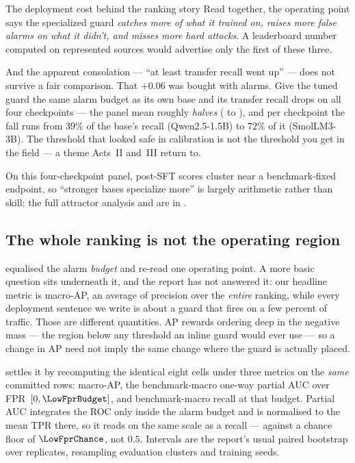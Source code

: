 \begin{takeaway}{The deployment cost behind the ranking story}
Read together, the operating point says the specialized guard \emph{catches more of what it trained on,
raises more false alarms on what it didn't, and misses more hard attacks}. A leaderboard number computed
on represented sources would advertise only the first of these three.

And the apparent consolation --- ``at least transfer recall went up'' --- does not survive a fair
comparison. That $+0.06$ was bought with alarms. Give the tuned guard the same alarm budget as its own
base and its transfer recall drops on all four checkpoints --- the panel mean roughly \emph{halves}
(\MatchedTransferBase{} to \MatchedTransferSft{}), and per checkpoint the fall runs from $39\%$ of the
base's recall (Qwen2.5-1.5B) to $72\%$ of it (SmolLM3-3B). The threshold that looked safe in calibration is not the threshold you get in the field ---
a theme Acts~II and~III return to.
\end{takeaway}

\noindent On this four-checkpoint panel, post-SFT scores cluster near a benchmark-fixed endpoint, so ``stronger bases specialize more'' is largely arithmetic rather than skill; the full attractor analysis and  are in .

\subsection{The whole ranking is not the operating region}
\label{sec:actI-lowfpr}

 equalised the alarm \emph{budget} and re-read one operating point. A more basic
question sits underneath it, and the report has not answered it: our headline metric is macro-AP,
an average of precision over the \emph{entire} ranking, while every deployment sentence we write is
about a guard that fires on a few percent of traffic. Those are different quantities. AP rewards
ordering deep in the negative mass --- the region below any threshold an inline guard would ever
use --- so a change in AP need not imply the same change where the guard is actually placed.

 settles it by recomputing the identical eight cells under three metrics on the
\emph{same} committed rows: macro-AP, the benchmark-macro one-way partial AUC over
FPR~$[0,\LowFprBudget]$, and benchmark-macro recall at that budget. Partial AUC integrates the ROC
only inside the alarm budget and is normalised to the mean TPR there, so it reads on the same scale
as a recall --- against a chance floor of $\LowFprChance$, not $0.5$. Intervals are the report's
usual paired bootstrap over \LowFprNBoot{} replicates, resampling evaluation 
clusters and training seeds.

